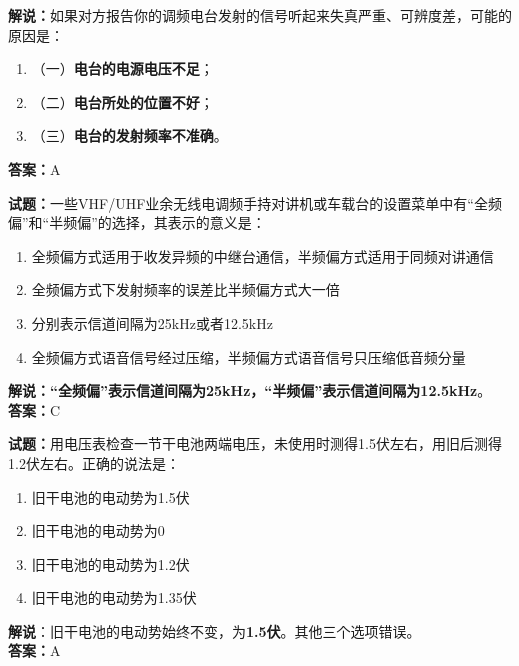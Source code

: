 \documentclass{ctexbook}
\begin{document}
\noindent\textbf{解说：}如果对方报告你的调频电台发射的信号听起来失真严重、可辨度差，可能的原因是：
\begin{enumerate}[label=, leftmargin=0.8em]
  \item （一）\textbf{电台的电源电压不足}；
  \item （二）\textbf{电台所处的位置不好}；
  \item （三）\textbf{电台的发射频率不准确}。
\end{enumerate}
\noindent\textbf{答案：}A

\vspace{\baselineskip}

\noindent\textbf{试题：}一些VHF/UHF业余无线电调频手持对讲机或车载台的设置菜单中有“全频偏”和“半频偏”的选择，其表示的意义是：

\begin{enumerate}[leftmargin=3em]
  \item 全频偏方式适用于收发异频的中继台通信，半频偏方式适用于同频对讲通信
  \item 全频偏方式下发射频率的误差比半频偏方式大一倍
  \item 分别表示信道间隔为25\si{\kHz}或者12.5\si{\kHz}
  \item 全频偏方式语音信号经过压缩，半频偏方式语音信号只压缩低音频分量
\end{enumerate}

\noindent\textbf{解说：}\textbf{“全频偏”表示信道间隔为25\si{\kHz}，“半频偏”表示信道间隔为12.5\si{\kHz}}。\\\noindent\textbf{答案：}C

\vspace{\baselineskip}

\noindent\textbf{试题：}用电压表检查一节干电池两端电压，未使用时测得1.5伏左右，用旧后测得1.2伏左右。正确的说法是：

\begin{enumerate}[leftmargin=3em]
  \item 旧干电池的电动势为1.5伏
  \item 旧干电池的电动势为0
  \item 旧干电池的电动势为1.2伏
  \item 旧干电池的电动势为1.35伏
\end{enumerate}

\noindent\textbf{解说}：旧干电池的电动势始终不变，为\textbf{1.5伏}。其他三个选项错误。\\\noindent\textbf{答案：}A

\vspace{\baselineskip}
\end{document}
